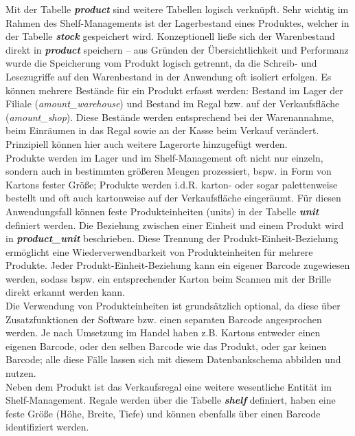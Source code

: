 Mit der Tabelle \textit{\textbf{product}} sind weitere Tabellen logisch verknüpft. Sehr wichtig im Rahmen des Shelf-Managements ist der Lagerbestand eines Produktes, welcher in der Tabelle \textit{\textbf{stock}} gespeichert wird. Konzeptionell ließe sich der Warenbestand direkt in \textit{\textbf{product}} speichern -- aus Gründen der Übersichtlichkeit und Performanz wurde die Speicherung vom Produkt logisch getrennt, da die Schreib- und Lesezugriffe auf den Warenbestand in der Anwendung oft isoliert erfolgen. Es können mehrere Bestände für ein Produkt erfasst werden: Bestand im Lager der Filiale (\textit{amount\_warehouse}) und Bestand im Regal bzw. auf der Verkaufsfläche (\textit{amount\_shop}). Diese Bestände werden entsprechend bei der Warenannahme, beim Einräumen in das Regal sowie an der Kasse beim Verkauf verändert. Prinzipiell können hier auch weitere Lagerorte hinzugefügt werden.\\

Produkte werden im Lager und im Shelf-Management oft nicht nur einzeln, sondern auch in bestimmten größeren Mengen prozessiert, bspw. in Form von Kartons fester Größe; Produkte werden i.d.R. karton- oder sogar palettenweise bestellt und oft auch kartonweise auf der Verkaufsfläche eingeräumt. Für diesen Anwendungsfall können feste Produkteinheiten (\glqq units\grqq ) in der Tabelle \textit{\textbf{unit}} definiert werden. Die Beziehung zwischen einer Einheit und einem Produkt wird in \textit{\textbf{product\_unit}} beschrieben. Diese Trennung der Produkt-Einheit-Beziehung ermöglicht eine Wiederverwendbarkeit von Produkteinheiten für mehrere Produkte. Jeder Produkt-Einheit-Beziehung kann ein eigener Barcode zugewiesen werden, sodass bspw. ein entsprechender Karton beim Scannen mit der Brille direkt erkannt werden kann.\\

Die Verwendung von Produkteinheiten ist grundsätzlich optional, da diese über Zusatzfunktionen der Software bzw. einen separaten Barcode angesprochen werden. Je nach Umsetzung im Handel haben z.B. Kartons entweder einen eigenen Barcode, oder den selben Barcode wie das Produkt, oder gar keinen Barcode; alle diese Fälle lassen sich mit diesem Datenbankschema abbilden und nutzen.\\

Neben dem Produkt ist das Verkaufsregal eine weitere wesentliche Entität im Shelf-Management. Regale werden über die Tabelle \textit{\textbf{shelf}} definiert, haben eine feste Größe (Höhe, Breite, Tiefe) und können ebenfalls über einen Barcode identifiziert werden.\\

